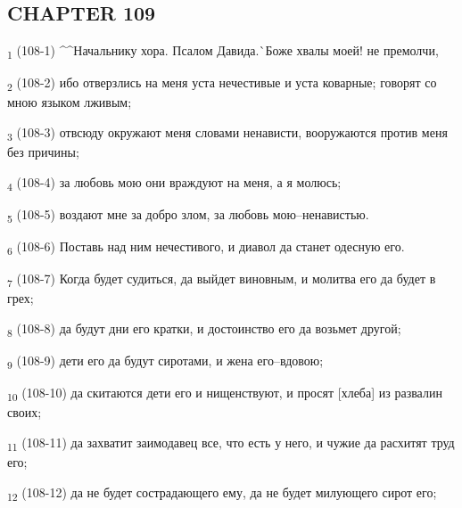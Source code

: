 \subsection{CHAPTER 109}
\begin{tcolorbox}
\textsubscript{1} (108-1) ^^Начальнику хора. Псалом Давида.^^ Боже хвалы моей! не премолчи,
\end{tcolorbox}
\begin{tcolorbox}
\textsubscript{2} (108-2) ибо отверзлись на меня уста нечестивые и уста коварные; говорят со мною языком лживым;
\end{tcolorbox}
\begin{tcolorbox}
\textsubscript{3} (108-3) отвсюду окружают меня словами ненависти, вооружаются против меня без причины;
\end{tcolorbox}
\begin{tcolorbox}
\textsubscript{4} (108-4) за любовь мою они враждуют на меня, а я молюсь;
\end{tcolorbox}
\begin{tcolorbox}
\textsubscript{5} (108-5) воздают мне за добро злом, за любовь мою--ненавистью.
\end{tcolorbox}
\begin{tcolorbox}
\textsubscript{6} (108-6) Поставь над ним нечестивого, и диавол да станет одесную его.
\end{tcolorbox}
\begin{tcolorbox}
\textsubscript{7} (108-7) Когда будет судиться, да выйдет виновным, и молитва его да будет в грех;
\end{tcolorbox}
\begin{tcolorbox}
\textsubscript{8} (108-8) да будут дни его кратки, и достоинство его да возьмет другой;
\end{tcolorbox}
\begin{tcolorbox}
\textsubscript{9} (108-9) дети его да будут сиротами, и жена его--вдовою;
\end{tcolorbox}
\begin{tcolorbox}
\textsubscript{10} (108-10) да скитаются дети его и нищенствуют, и просят [хлеба] из развалин своих;
\end{tcolorbox}
\begin{tcolorbox}
\textsubscript{11} (108-11) да захватит заимодавец все, что есть у него, и чужие да расхитят труд его;
\end{tcolorbox}
\begin{tcolorbox}
\textsubscript{12} (108-12) да не будет сострадающего ему, да не будет милующего сирот его;
\end{tcolorbox}
